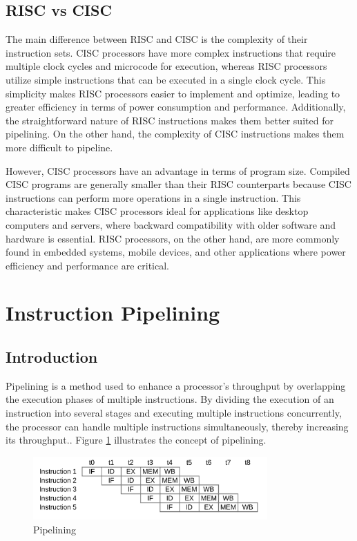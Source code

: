 \subsection{RISC vs CISC}
The main difference between RISC and CISC is the complexity of their instruction sets. CISC processors have more complex instructions that require multiple clock cycles and microcode for execution, whereas RISC processors utilize simple instructions that can be executed in a single clock cycle\cite{jamil1995risc}. This simplicity makes RISC processors easier to implement and optimize, leading to greater efficiency in terms of power consumption and performance. Additionally, the straightforward nature of RISC instructions makes them better suited for pipelining. On the other hand, the complexity of CISC instructions makes them more difficult to pipeline.

However, CISC processors have an advantage in terms of program size. Compiled CISC programs are generally smaller than their RISC counterparts because CISC instructions can perform more operations in a single instruction\cite{jamil1995risc}. This characteristic makes CISC processors ideal for applications like desktop computers and servers, where backward compatibility with older software and hardware is essential. RISC processors, on the other hand, are more commonly found in embedded systems, mobile devices, and other applications where power efficiency and performance are critical\cite{ryzhyk2006arm}.

\section {Instruction Pipelining}\label{sec:pipelining}

\subsection {Introduction}\label{sec:pipelining_intro}
Pipelining is a method used to enhance a processor's throughput by overlapping the execution phases of multiple instructions. By dividing the execution of an instruction into several stages and executing multiple instructions concurrently, the processor can handle multiple instructions simultaneously, thereby increasing its throughput.\cite{olanrewaju2017design}. Figure \ref{fig:pipeline} illustrates the concept of pipelining.

\begin{figure}[H]
    \centering
    \includegraphics[width=0.8\textwidth]{assets/images/pipeline.png}
    \caption{Pipelining} 
    \label{fig:pipeline} 
\end{figure}

